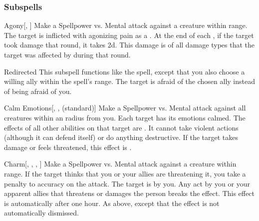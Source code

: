 \subsubsection{Subspells}


\begin{ability}[\nth{2}]{Agony}[, ]
Make a Spellpower vs. Mental attack against a creature within \rngmed range.
\hit The target is inflicted with agonizing pain as a .
At the end of each , if the target took damage that round, it takes  \minus2d.
This damage is of all damage types that the target was affected by during that round.
\end{ability}
\vspace{0.25em}


\begin{ability}[\nth{2}]{Redirected}
This subspell functions like the  spell, except that you also choose a willing ally within the spell's range.
The target is afraid of the chosen ally instead of being afraid of you.
\end{ability}
\vspace{0.25em}


\begin{ability}[\nth{3}]{Calm Emotions}[, ,  (standard)]
Make a Spellpower vs. Mental attack against all creatures within an \areamed radius from you.
\hit Each target has its emotions calmed.
The effects of all other  abilities on that target are .
It cannot take violent actions (although it can defend itself) or do anything destructive.
If the target takes damage or feels threatened, this effect is .
\end{ability}
\vspace{0.25em}


\begin{ability}[\nth{3}]{Charm}[, , , ]
Make a Spellpower vs. Mental attack against a creature within \rngmed range.
If the target thinks that you or your allies are threatening it, you take a  penalty to accuracy on the attack.
\hit The target is \charmed by you.
Any act by you or your apparent allies that threatens or damages the  person breaks the effect.
This effect is automatically  after one hour.
\crit As above, except that the effect is not automatically dismissed.
\end{ability}
\vspace{0.25em}


